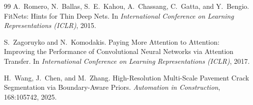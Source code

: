 \documentclass[11pt,a4paper]{article}
\begin{document}
\begin{thebibliography}{99}
A.~Romero, N.~Ballas, S.~E.~Kahou, A.~Chassang, C.~Gatta, and Y.~Bengio.
\newblock FitNets: Hints for Thin Deep Nets.
\newblock In \emph{International Conference on Learning Representations (ICLR)}, 2015.

S.~Zagoruyko and N.~Komodakis.
\newblock Paying More Attention to Attention: Improving the Performance of Convolutional Neural Networks via Attention Transfer.
\newblock In \emph{International Conference on Learning Representations (ICLR)}, 2017.

H.~Wang, J.~Chen, and M.~Zhang.
\newblock High-Resolution Multi-Scale Pavement Crack Segmentation via Boundary-Aware Priors.
\newblock \emph{Automation in Construction}, 168:105742, 2025.
\end{thebibliography}
\end{document}
